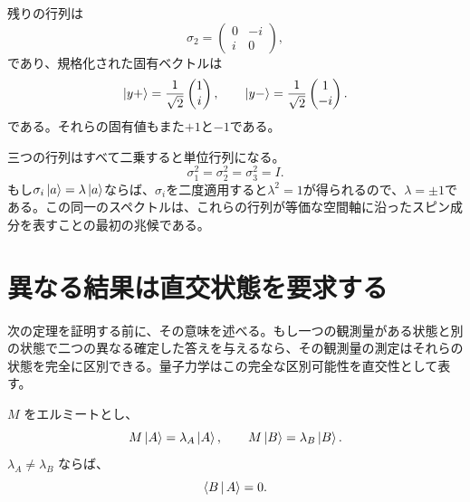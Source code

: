 \begin{classroomqa}
\end{classroomqa}

残りの行列は
\begin{equation}
  \sigma_2=
  \begin{pmatrix}
    0&-i\\
    i&0
  \end{pmatrix},
\end{equation}
であり、規格化された固有ベクトルは
\begin{equation}
  \left\lvert y+\right\rangle=\frac{1}{\sqrt2}\begin{pmatrix}1\\i\end{pmatrix},
  \qquad
  \left\lvert y-\right\rangle=\frac{1}{\sqrt2}\begin{pmatrix}1\\-i\end{pmatrix}.
  \label{eq:l03-sigma-two-eigenvectors}
\end{equation}
である。それらの固有値もまた\(+1\)と\(-1\)である。

三つの行列はすべて二乗すると単位行列になる。
\begin{equation}
  \sigma_1^2=\sigma_2^2=\sigma_3^2=I.
  \label{eq:l03-pauli-squares}
\end{equation}
もし\(\sigma_i\left\lvert a\right\rangle=\lambda\left\lvert a\right\rangle\)ならば、\(\sigma_i\)を二度適用すると\(\lambda^2=1\)が得られるので、\(\lambda=\pm1\)である。この同一のスペクトルは、これらの行列が等価な空間軸に沿ったスピン成分を表すことの最初の兆候である。

\section{異なる結果は直交状態を要求する}

次の定理を証明する前に、その意味を述べる。もし一つの観測量がある状態と別の状態で二つの異なる確定した答えを与えるなら、その観測量の測定はそれらの状態を完全に区別できる。量子力学はこの完全な区別可能性を直交性として表す。

\begin{theorem}
\(M\) をエルミートとし、
\begin{equation}
  M\left\lvert A\right\rangle=\lambda_A\left\lvert A\right\rangle,
  \qquad
  M\left\lvert B\right\rangle=\lambda_B\left\lvert B\right\rangle.
\end{equation}
\(\lambda_A\ne\lambda_B\) ならば、
\begin{equation}
  \left\langle B\,\middle|\,A\right\rangle=0.
\end{equation}
\end{theorem}

